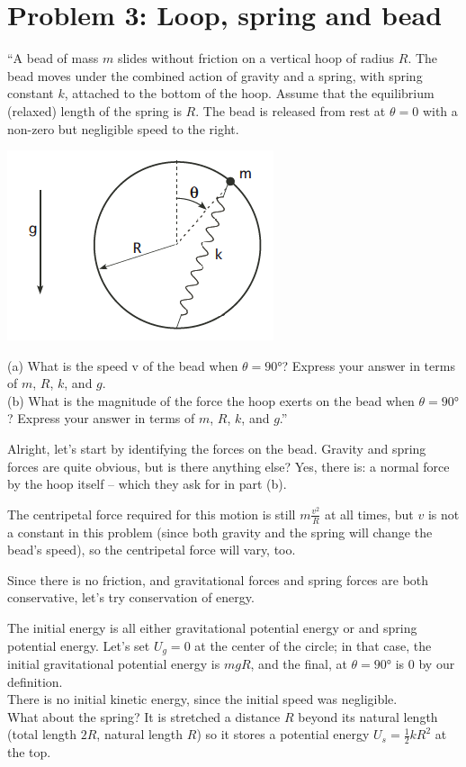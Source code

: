 \documentclass[8.01x]{subfiles}
\begin{document}
\section{Problem 3: Loop, spring and bead}

``A bead of mass $m$ slides without friction on a vertical hoop of radius $R$. The bead moves under the combined action of gravity and a spring, with spring constant $k$, attached to the bottom of the hoop. Assume that the equilibrium (relaxed) length of the spring is $R$. The bead is released from rest at $\theta = 0$ with a non-zero but negligible speed to the right.

\begin{center}
\includegraphics[scale=0.8]{Graphics/h5p3}
\end{center}

(a) What is the speed v of the bead when $\theta = \ang{90}$? Express your answer in terms of $m$, $R$, $k$, and $g$.\\
(b) What is the magnitude of the force the hoop exerts on the bead when $\theta = \ang{90}$? Express your answer in terms of $m$, $R$, $k$, and $g$.''

Alright, let's start by identifying the forces on the bead. Gravity and spring forces are quite obvious, but is there anything else? Yes, there is: a normal force by the hoop itself -- which they ask for in part (b).

The centripetal force required for this motion is still $m \frac{v^2}{R}$ at all times, but $v$ is not a constant in this problem (since both gravity and the spring will change the bead's speed), so the centripetal force will vary, too.





Since there is no friction, and gravitational forces and spring forces are both conservative, let's try conservation of energy.

The initial energy is all either gravitational potential energy or and spring potential energy. Let's set $U_g = 0$ at the center of the circle; in that case, the initial gravitational potential energy is $m g R$, and the final, at $\theta = \ang{90}$ is $0$ by our definition.\\
There is no initial kinetic energy, since the initial speed was negligible.\\
What about the spring? It is stretched a distance $R$ beyond its natural length (total length $2 R$,  natural length $R$) so it stores a potential energy $U_s = \frac{1}{2} k R^2$ at the top.
\end{document}
